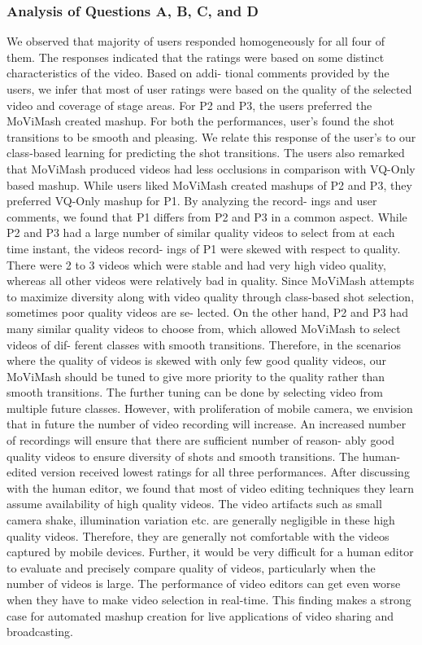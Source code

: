 \documentclass{sig-alternate}
\begin{document}
\subsubsection{ Analysis of Questions A, B, C, and D }
We observed that majority of users responded homogeneously
for all four of them. The responses indicated that the ratings were
based on some distinct characteristics of the video. Based on addi-
tional comments provided by the users, we infer that most of user
ratings were based on the quality of the selected video and coverage
of stage areas.
For P2 and P3, the users preferred the MoViMash created mashup.
For both the performances, user’s found the shot transitions to be
smooth and pleasing. We relate this response of the user’s to our
class-based learning for predicting the shot transitions. The users
also remarked that MoViMash produced videos had less occlusions
in comparison with VQ-Only based mashup.
While users liked MoViMash created mashups of P2 and P3,
they preferred VQ-Only mashup for P1. By analyzing the record-
ings and user comments, we found that P1 differs from P2 and P3 in
a common aspect. While P2 and P3 had a large number of similar
quality videos to select from at each time instant, the videos record-
ings of P1 were skewed with respect to quality. There were 2 to 3
videos which were stable and had very high video quality, whereas
all other videos were relatively bad in quality. Since MoViMash
attempts to maximize diversity along with video quality through
class-based shot selection, sometimes poor quality videos are se-
lected.
On the other hand, P2 and P3 had many similar quality videos
to choose from, which allowed MoViMash to select videos of dif-
ferent classes with smooth transitions. Therefore, in the scenarios
where the quality of videos is skewed with only few good quality
videos, our MoViMash should be tuned to give more priority to
the quality rather than smooth transitions. The further tuning can
be done by selecting video from multiple future classes. However,
with proliferation of mobile camera, we envision that in future the
number of video recording will increase. An increased number of
recordings will ensure that there are sufficient number of reason-
ably good quality videos to ensure diversity of shots and smooth
transitions.
The human-edited version received lowest ratings for all three
performances. After discussing with the human editor, we found
that most of video editing techniques they learn assume availability
of high quality videos. The video artifacts such as small camera shake, illumination variation etc. are generally negligible in these
high quality videos. Therefore, they are generally not comfortable
with the videos captured by mobile devices. Further, it would be
very difficult for a human editor to evaluate and precisely compare
quality of videos, particularly when the number of videos is large.
The performance of video editors can get even worse when they
have to make video selection in real-time. This finding makes a
strong case for automated mashup creation for live applications of
video sharing and broadcasting.
\end{document}
